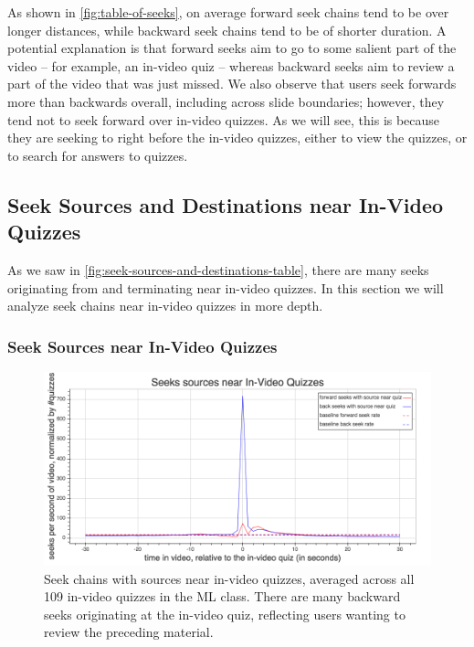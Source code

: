 \documentclass{sigchi}
\begin{document}
As shown in \autoref{fig:table-of-seeks}, on average forward seek chains tend to be over longer distances, while backward seek chains tend to be of shorter duration. A potential explanation is that forward seeks aim to go to some salient part of the video -- for example, an in-video quiz -- whereas backward seeks aim to review a part of the video that was just missed. We also observe that users seek forwards more than backwards overall, including across slide boundaries; however, they tend not to seek forward over in-video quizzes. As we will see, this is because they are seeking to right before the in-video quizzes, either to view the quizzes, or to search for answers to quizzes. %

\subsection{Seek Sources and Destinations near In-Video Quizzes}


As we saw in \autoref{fig:seek-sources-and-destinations-table}, there are many seeks originating from and terminating near in-video quizzes. In this section we will analyze seek chains near in-video quizzes in more depth. %

\subsubsection{Seek Sources near In-Video Quizzes}

\begin{figure}
\includegraphics[width=1.0\columnwidth]{seek-sources-near-quizzes}
\caption{Seek chains with sources near in-video quizzes, averaged across all 109 in-video quizzes in the ML class. There are many backward seeks originating at the in-video quiz, reflecting users wanting to review the preceding material.}
\label{fig:seek-sources-near-quizzes}
\end{figure}
\end{document}
